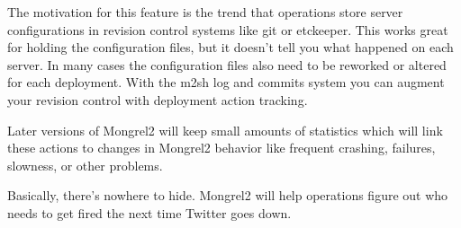 The motivation for this feature is the trend that operations store server configurations
in revision control systems like git or etckeeper.  This works great for holding the configuration
files, but it doesn't tell you what happened on each server.  In many cases the configuration
files also need to be reworked or altered for each deployment.  With the m2sh log and commits
system you can augment your revision control with deployment action tracking.

Later versions of Mongrel2 will keep small amounts of statistics which will link these actions
to changes in Mongrel2 behavior like frequent crashing, failures, slowness, or other problems.

Basically, there's nowhere to hide.  Mongrel2 will help operations figure out who needs to
get fired the next time Twitter goes down.

